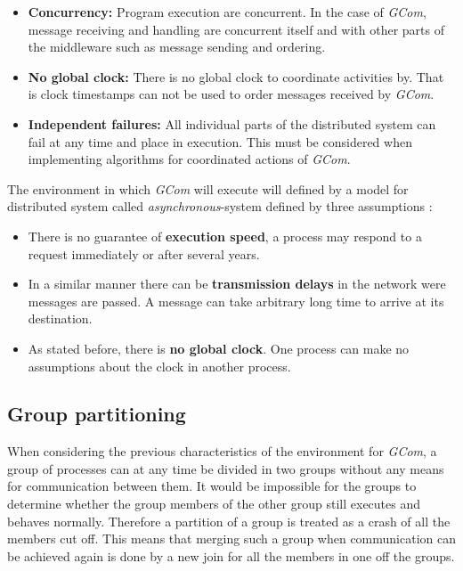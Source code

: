 \documentclass[titlepage, twocolumn, a4paper, 10pt]{article}
\begin{document}
\begin{itemize}
\item \textbf{Concurrency: } Program execution are concurrent. In the
  case of \textit{GCom}, message receiving and handling are concurrent
  itself and with other parts of the middleware such as message
  sending and ordering.
\item \textbf{No global clock: } There is no global clock to
  coordinate activities by. That is clock timestamps can not be used
  to order messages received by \textit{GCom}.
\item \textbf{Independent failures: } All individual parts of the
  distributed system can fail at any time and place in execution. This
  must be considered when implementing algorithms for coordinated
  actions of \textit{GCom}.
\end{itemize}

The environment in which \textit{GCom} will execute will defined by
a model for distributed system called \textit{asynchronous}-system
defined by three assumptions \cite{book:dist-syst}:

\begin{itemize}
\item There is no guarantee of \textbf{execution speed}, a process may respond
  to a request immediately or after several years.
\item In a similar manner there can be \textbf{transmission delays} in the
  network were messages are passed. A message can take arbitrary long
  time to arrive at its destination.
\item As stated before, there is \textbf{no global clock}. One process can make
  no assumptions about the clock in another process.
\end{itemize}

\subsection{Group partitioning}\label{sec:group-partitioning}
When considering the previous characteristics of the environment for
\textit{GCom}, a group of processes can at any time be divided in two
groups without any means for communication between them. It would be
impossible for the groups to determine whether the group members of
the other group still executes and behaves normally. Therefore a
partition of a group is treated as a crash of all the members cut off.
This means that merging such a group when communication can be
achieved again is done by a new join for all the members in one off
the groups.
\end{document}
